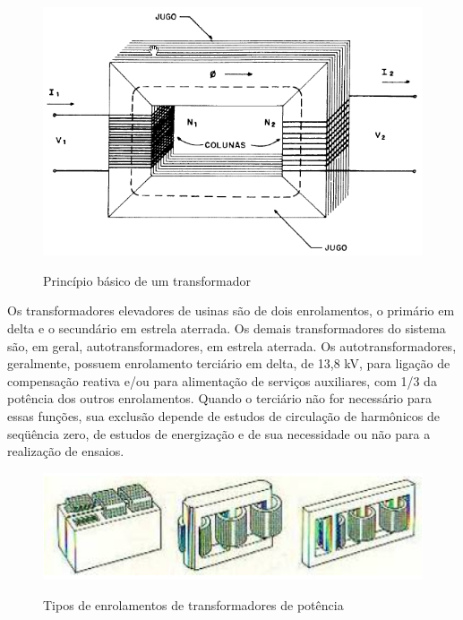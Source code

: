 \documentclass[a5paper]{ufsc-thesis}
\begin{document}
\begin{figure}[htb]
  \caption{Princípio básico de um transformador}
  \centering
  \includegraphics[width=12cm]{transformador.jpg}
  \label{fig:transformador}
\end{figure}

Os transformadores elevadores de usinas são de dois enrolamentos, o primário em delta e o secundário em estrela aterrada. Os demais transformadores do sistema são, em geral, autotransformadores, em estrela aterrada. Os autotransformadores, geralmente, possuem enrolamento terciário em delta, de 13,8 kV, para ligação de compensação reativa e/ou para alimentação de serviços auxiliares, com 1/3 da potência dos outros enrolamentos. Quando o terciário não for necessário para essas funções, sua exclusão depende de estudos de circulação de harmônicos de seqüência zero, de estudos de energização e de sua necessidade ou não para a realização de ensaios.\par

\begin{figure}[htb]
  \caption{Tipos de enrolamentos de transformadores de potência}
  \centering
  \includegraphics[width=12cm]{tiposdetrafo.jpg}
  \label{fig:tiposdetrafo}
\end{figure}
\end{document}

